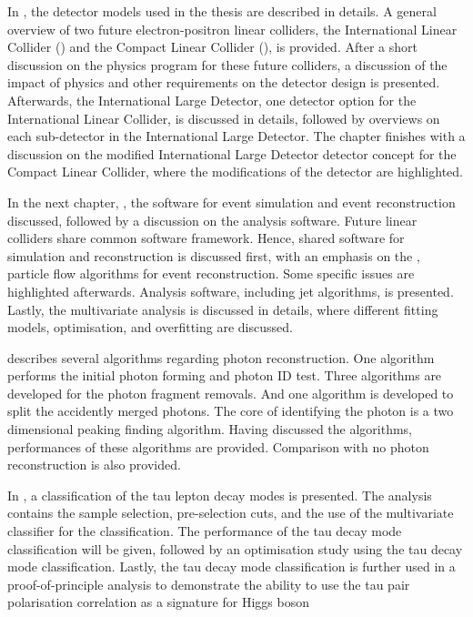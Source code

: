In , the detector models used in the thesis are described in details. A general overview of two future electron-positron linear colliders, the International Linear Collider (\ILC) and the Compact Linear Collider (\CLIC), is provided. After a short discussion on the physics program for these future colliders, a discussion of the impact of physics and other requirements on the detector design is presented. Afterwards, the International Large Detector, one detector option for the International Linear Collider, is discussed in details, followed by overviews on each sub-detector in the International Large Detector. The chapter finishes with a discussion on the modified International Large Detector detector concept for the Compact Linear Collider, where the modifications of the detector are highlighted.

In the next chapter, , the software for event simulation and event reconstruction  discussed, followed by a discussion on the analysis software. Future linear colliders share common software framework. Hence, shared software for simulation and reconstruction is discussed first, with an emphasis on the \pandora, particle flow algorithms for event reconstruction. Some \CLIC specific issues are highlighted afterwards. Analysis software, including jet algorithms, is presented. Lastly, the multivariate analysis is discussed in details, where different fitting models, optimisation, and overfitting are discussed. 


 describes several \pandora algorithms regarding photon reconstruction. One algorithm performs the initial photon forming and photon ID test. Three algorithms are developed for the photon fragment removals. And one algorithm is developed to split the accidently merged photons. The core of identifying the photon is a two dimensional peaking finding algorithm. Having discussed the algorithms, performances of these algorithms are provided. Comparison with no photon reconstruction is also provided.

In , a classification of the tau lepton decay modes is presented. The analysis contains the sample selection, pre-selection cuts, and the use of the multivariate classifier for the classification.  The performance of the tau decay mode classification will be given, followed by an \ECAL optimisation study using the tau decay mode classification. Lastly, the  tau decay mode classification is further used in a proof-of-principle analysis to demonstrate the ability to use the tau pair polarisation correlation as a signature for Higgs boson 


